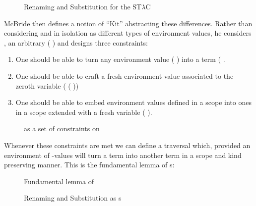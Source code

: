 \begin{figure}[h]
\caption{Renaming\label{ren} and Substitution\label{sub} for the ST$λ$C}
\end{figure}

McBride then defines a notion of ``Kit'' abstracting these differences.
Rather than considering  and  in isolation as different
types of environment values, he considers , an arbitrary
( ) and designs three constraints:

\begin{enumerate}
  \item
    One should be able to turn any environment value
    (  ) into a term (  .
  \item
    One should be able to craft a fresh environment value
    associated to the zeroth variable (  (  ))
  \item
    One should be able to embed environment values defined in a
    scope  into ones in a scope extended with a fresh variable
    (  ).
\end{enumerate}

\begin{figure}[h]
\caption{ as a set of constraints on }
\end{figure}

Whenever these constraints are met we can define a traversal which,
provided an environment of -values will turn a term into another
term in a scope and kind preserving manner. This is the fundamental
lemma of s:

\begin{figure}[h]
\caption{Fundamental lemma of }
\end{figure}

\begin{figure}[h]
\begin{minipage}{0.5\textwidth}
\end{minipage}
\begin{minipage}{0.5\textwidth}
\end{minipage}
\caption{Renaming and Substitution as s}
\end{figure}


